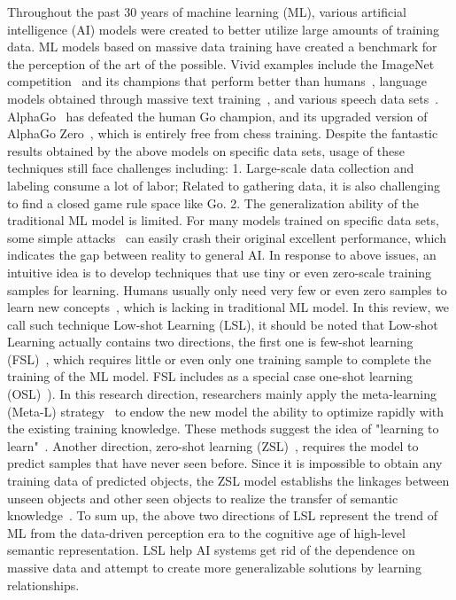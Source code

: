 

\label{sec1}
Throughout the past 30 years of machine learning (ML), various artificial intelligence (AI) models were created to better utilize large amounts of training data.  ML models based on massive data training have created a benchmark for the perception of the art of the possible. Vivid examples include the ImageNet competition~ and its champions that perform better than humans~, language models obtained through massive text  training~, and various speech data sets~.  AlphaGo~ has defeated the human Go champion, and its upgraded version of AlphaGo Zero~, which is entirely free from chess training.
Despite the fantastic results obtained by the above models on specific data sets, usage of these techniques still face  challenges including: 1. Large-scale data collection and labeling consume a lot of labor; Related to gathering data, it is also challenging to find a closed game rule space like Go.  2. The generalization ability of the traditional ML model is limited. For many models trained on specific data sets, some simple attacks~ can easily crash their original excellent performance, which indicates the gap between reality to general AI.
In response to above issues, an intuitive idea is to develop techniques that use tiny or even zero-scale training samples for learning. Humans usually only need very few or even zero samples to learn new concepts~, which is lacking in traditional ML model. In this review, we call such technique Low-shot Learning (LSL), it should be noted that Low-shot Learning actually contains two directions, the first one is few-shot learning (FSL)~, which requires little or even only one training sample to complete the training of the ML model. FSL includes as a special case one-shot learning (OSL)~). In this research direction, researchers mainly apply the meta-learning (Meta-L) strategy~ to endow the new model the ability to optimize rapidly with the existing training knowledge. These methods suggest the idea of "learning to learn"~. Another direction, zero-shot learning (ZSL)~, requires the model to predict samples that have never seen before. Since it is impossible to obtain any training data of predicted objects, the ZSL model establishs the linkages between unseen objects and other seen objects to realize the transfer of semantic knowledge~. To sum up, the above two directions of LSL represent the trend of  ML from the data-driven perception era to the cognitive age of high-level semantic representation. LSL help AI systems get rid of the dependence on massive data and attempt to create more generalizable solutions by learning relationships.
